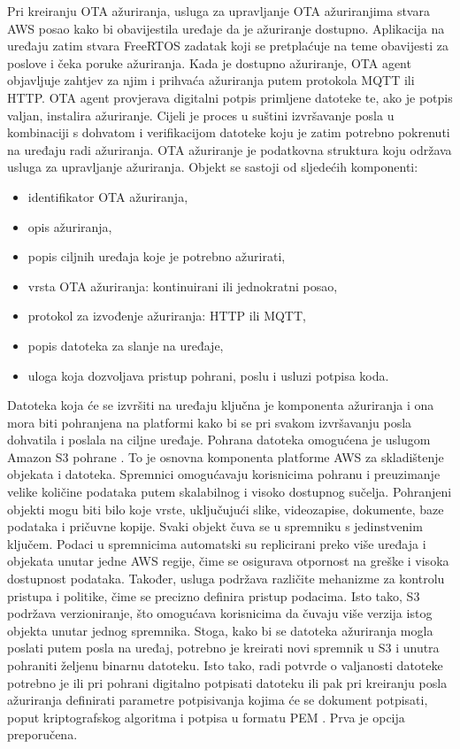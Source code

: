 Pri kreiranju OTA ažuriranja, usluga za upravljanje OTA ažuriranjima  stvara AWS posao kako bi obavijestila uređaje da je ažuriranje dostupno. Aplikacija na uređaju zatim stvara FreeRTOS zadatak koji se pretplaćuje na teme obavijesti za poslove i čeka poruke ažuriranja. Kada je dostupno ažuriranje, OTA agent objavljuje zahtjev za njim i prihvaća ažuriranja putem protokola MQTT ili HTTP. OTA agent provjerava digitalni potpis primljene datoteke te, ako je potpis valjan, instalira ažuriranje. Cijeli je proces u suštini izvršavanje posla u kombinaciji s dohvatom i verifikacijom datoteke koju je zatim potrebno pokrenuti na uređaju radi ažuriranja. OTA ažuriranje je podatkovna struktura koju održava usluga za upravljanje ažuriranja. Objekt se sastoji od sljedećih komponenti:
\begin{itemize}
	\item identifikator OTA ažuriranja,
	\item opis ažuriranja,
	\item popis ciljnih uređaja koje je potrebno ažurirati,
	\item vrsta OTA ažuriranja: kontinuirani ili jednokratni posao,
	\item protokol za izvođenje ažuriranja: HTTP ili MQTT,
	\item popis datoteka za slanje na uređaje,
	\item uloga  koja dozvoljava pristup pohrani, poslu i usluzi potpisa koda.
\end{itemize}

Datoteka koja će se izvršiti na uređaju ključna je komponenta ažuriranja i ona mora biti pohranjena na platformi kako bi se pri svakom izvršavanju posla dohvatila i poslala na ciljne uređaje. Pohrana datoteka omogućena je uslugom Amazon S3 pohrane . To je osnovna komponenta platforme AWS za skladištenje objekata i datoteka. Spremnici  omogućavaju korisnicima pohranu i preuzimanje velike količine podataka putem skalabilnog i visoko dostupnog sučelja. Pohranjeni objekti mogu biti bilo koje vrste, uključujući slike, videozapise, dokumente, baze podataka i pričuvne kopije. Svaki objekt čuva se u spremniku s jedinstvenim ključem. Podaci u spremnicima automatski su replicirani preko više uređaja i objekata unutar jedne AWS regije, čime se osigurava otpornost na greške i visoka dostupnost podataka. Također, usluga podržava različite mehanizme za kontrolu pristupa i politike, čime se precizno definira pristup podacima. Isto tako, S3 podržava verzioniranje, što omogućava korisnicima da čuvaju više verzija istog objekta unutar jednog spremnika. Stoga, kako bi se datoteka ažuriranja mogla poslati putem posla na uređaj, potrebno je kreirati novi spremnik u S3 i unutra pohraniti željenu binarnu datoteku. Isto tako, radi potvrde o valjanosti datoteke potrebno je ili pri pohrani digitalno potpisati datoteku ili pak pri kreiranju posla ažuriranja definirati parametre potpisivanja kojima će se dokument potpisati, poput kriptografskog algoritma i potpisa u formatu PEM . Prva je opcija preporučena. 

